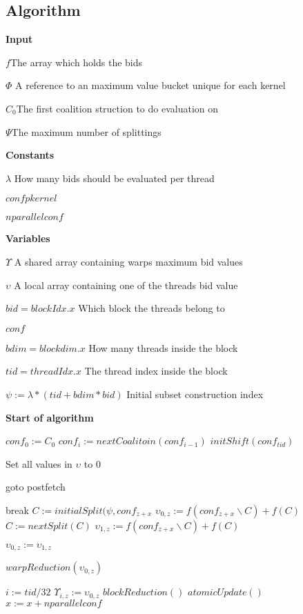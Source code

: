 \documentclass{aamas2012}
\begin{document}
\subsection{Algorithm}
\begin{algorithm}
\textbf{Input}

$f$\hfill The array which holds the bids

$ \Phi $ \hfill A reference to an maximum value bucket unique for each kernel

$C_0$\hfill The first coalition struction to do evaluation on

$\Psi$\hfill The maximum number of splittings

\textbf{Constants}

$\lambda$ \hfill How many bids should be evaluated per thread

$confpkernel$

$nparallelconf$

\textbf{Variables} 

$\Upsilon$ \hfill A shared array containing warps maximum bid values

$\upsilon$ \hfill A local array containing one of the threads bid value

$bid = blockIdx.x$ \hfill Which block the threads belong to

$conf$

$bdim = blockdim.x$ \hfill How many threads inside the block

$tid = threadIdx.x$ \hfill The thread index inside the block

$\psi := \lambda*(tid+bdim*bid)$ \hfill Initial subset construction index

\textbf{Start of algorithm}
\begin{algorithmic}[1]
  \STATE $conf_0 := C_0$
    \STATE $conf_i := nextCoalitoin(conf_{i-1})$
  \ENDFOR
\ENDIF
{}
  \STATE $initShift(conf_{tid})$
\ENDIF

  \STATE Set all values in $\upsilon$ to 0

  \IF{$\psi \geq \Psi$}
    \STATE goto postfetch
  \ENDIF

      \STATE break
    \ENDIF
    \STATE $C := initialSplit(\psi,conf_{z+x}$
    \STATE $\upsilon_{0,z} := f(conf_{z+x}\backslash C)+f(C)$
    \STATE $C := nextSplit(C)$
    \STATE $\upsilon_{1,z} := f(conf_{z+x}\backslash C)+f(C)$
  \ENDFOR

  
      \STATE $\upsilon_{0,z} := \upsilon_{1,z}$
    \ENDIF
    
    \STATE $warpReduction(\upsilon_{0,z})$
    
      \STATE $i := tid / 32$
      \STATE $\Upsilon_{i,z} := \upsilon_{0,z}$
    \ENDIF
  \ENDFOR
  \STATE $blockReduction()$
  \STATE $atomicUpdate()$
  \ENDIF
  \STATE $x := x + nparallelconf$
\ENDFOR
\end{algorithmic}
\end{algorithm}
\end{document}
